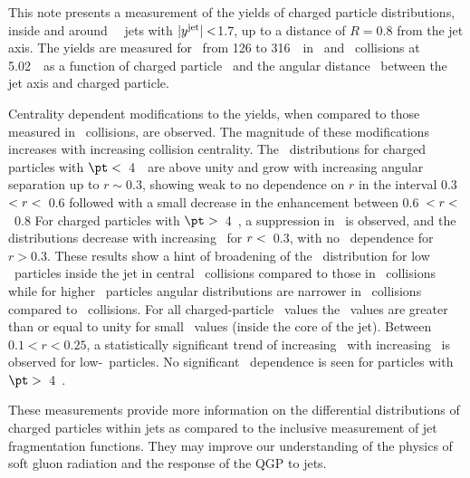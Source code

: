 
This note presents a measurement of the yields of charged particle distributions, \Dptr\, inside and around \RFour\ \antikt\ jets with $|\mbox{$y^{\mathrm{jet}}$}| <$1.7, up to a distance of $R = 0.8$ from the jet axis. The yields are measured for \ptjet\ from 126 to 316~\GeV\ in \PbPb\ and \pp\ collisions at 5.02~\TeV\ as a function of charged particle \pt\ and the angular distance \rvar\ between the jet axis and charged particle.

Centrality dependent modifications to the yields, when compared to those measured in \pp\ collisions, are observed. The magnitude of these modifications increases with increasing collision centrality. 
The \RDptr\ distributions for charged particles with $\pt <$~4~\GeV\ 
are above unity and 
grow with increasing angular separation up to $r \sim0.3$, showing weak to no dependence on $r$ in the interval 0.3~$< \mbox{$r$} <$~0.6 followed with a small decrease in the enhancement between 0.6~$< \mbox{$r$} <$~0.8
For charged particles with $\pt >$~4~\GeV, a suppression in \RDptr\ is observed, and the 
distributions decrease with increasing
\rvar\ for $\mbox{$r$} < $~0.3, with no \rvar\ dependence for $r>0.3$. 
These results show a hint of broadening of the \Dptr\ distribution for low \pt\ particles inside the jet
in central \pbpb\ collisions compared to those in \pp\ collisions while for higher \pt\ particles
angular distributions are narrower in \pbpb\ collisions compared to \pp\ collisions.
For all charged-particle \pt\ values the \RDptr\ values are greater than or equal to unity for
small \rvar\ values (inside the core of the jet).
Between $0.1 < r < 0.25$, a statistically significant trend of increasing \RDptr\ with increasing \ptjet\ is observed for low-\pt\ particles. No significant \ptjet\ dependence is seen for particles  with $\pt >$~4~\GeV.

These measurements provide more information on the differential distributions of charged particles within jets as compared to the inclusive measurement of jet fragmentation functions. %
They may improve our understanding of the physics of soft
gluon radiation and the response of the QGP to jets.
